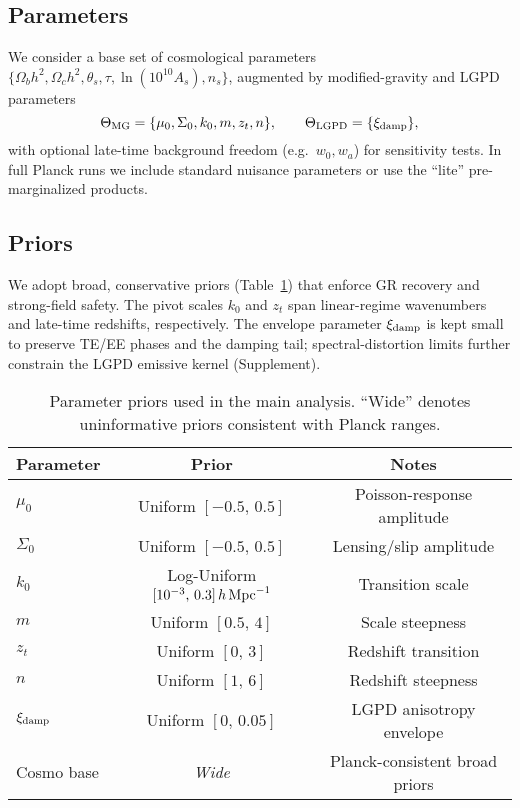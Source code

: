 \label{sec:methods}

\subsection{Parameters}
We consider a base set of cosmological parameters $\{\Omega_b h^2,\Omega_c h^2,\theta_s,\tau,\ln(10^{10}A_s),n_s\}$, augmented by modified-gravity and LGPD parameters
\[
\Theta_{\rm MG}=\{\mu_0,\Sigma_0,k_0,m,z_t,n\},\qquad
\Theta_{\rm LGPD}=\{\xi_{\rm damp}\},
\]
with optional late-time background freedom (e.g.\ $w_0,w_a$) for sensitivity tests. In full Planck runs we include standard nuisance parameters or use the ``lite'' pre-marginalized products.

\subsection{Priors}
We adopt broad, conservative priors (Table~\ref{tab:priors}) that enforce GR recovery and strong-field safety. The pivot scales $k_0$ and $z_t$ span linear-regime wavenumbers and late-time redshifts, respectively. The envelope parameter $\xi_{\rm damp}$ is kept small to preserve TE/EE phases and the damping tail; spectral-distortion limits further constrain the LGPD emissive kernel (Supplement).

\begin{table}[t]
\centering
\caption{Parameter priors used in the main analysis. ``Wide'' denotes uninformative priors consistent with Planck ranges.}
\label{tab:priors}
\begin{tabular}{lcc}
\hline
Parameter & Prior & Notes \\
\hline
$\mu_0$ & Uniform $[-0.5,\,0.5]$ & Poisson-response amplitude \\
$\Sigma_0$ & Uniform $[-0.5,\,0.5]$ & Lensing/slip amplitude \\
$k_0$ & Log-Uniform $[10^{-3},\,0.3]\,h\,{\rm Mpc}^{-1}$ & Transition scale \\
$m$ & Uniform $[0.5,\,4]$ & Scale steepness \\
$z_t$ & Uniform $[0,\,3]$ & Redshift transition \\
$n$ & Uniform $[1,\,6]$ & Redshift steepness \\
$\xi_{\rm damp}$ & Uniform $[0,\,0.05]$ & LGPD anisotropy envelope \\
Cosmo base & \emph{Wide} & Planck-consistent broad priors \\
\hline
\end{tabular}
\end{table}

